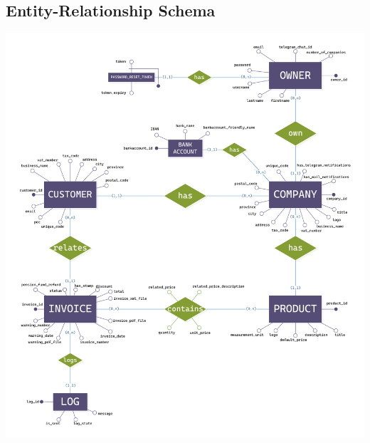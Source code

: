 \subsection{Entity-Relationship Schema}

\includegraphics[width=\textwidth,height=\textheight,keepaspectratio]{resources/ERSchema.pdf}



